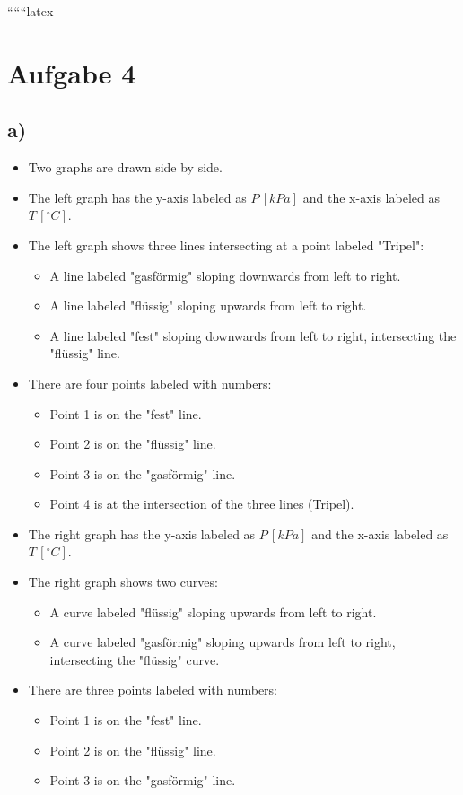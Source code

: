 
``````latex


\section*{Aufgabe 4}

\subsection*{a)}

\begin{itemize}
    \item Two graphs are drawn side by side.
    \item The left graph has the y-axis labeled as $P \, [kPa]$ and the x-axis labeled as $T \, [^\circ C]$.
    \item The left graph shows three lines intersecting at a point labeled "Tripel":
        \begin{itemize}
            \item A line labeled "gasförmig" sloping downwards from left to right.
            \item A line labeled "flüssig" sloping upwards from left to right.
            \item A line labeled "fest" sloping downwards from left to right, intersecting the "flüssig" line.
        \end{itemize}
    \item There are four points labeled with numbers:
        \begin{itemize}
            \item Point 1 is on the "fest" line.
            \item Point 2 is on the "flüssig" line.
            \item Point 3 is on the "gasförmig" line.
            \item Point 4 is at the intersection of the three lines (Tripel).
        \end{itemize}
    \item The right graph has the y-axis labeled as $P \, [kPa]$ and the x-axis labeled as $T \, [^\circ C]$.
    \item The right graph shows two curves:
        \begin{itemize}
            \item A curve labeled "flüssig" sloping upwards from left to right.
            \item A curve labeled "gasförmig" sloping upwards from left to right, intersecting the "flüssig" curve.
        \end{itemize}
    \item There are three points labeled with numbers:
        \begin{itemize}
            \item Point 1 is on the "fest" line.
            \item Point 2 is on the "flüssig" line.
            \item Point 3 is on the "gasförmig" line.
        \end{itemize}
\end{itemize}

